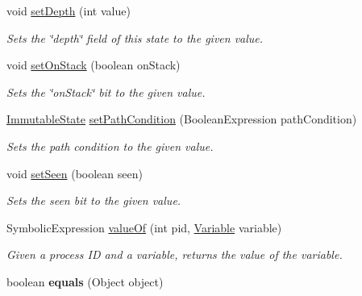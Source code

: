 \begin{DoxyCompactItemize}
void \hyperlink{classedu_1_1udel_1_1cis_1_1vsl_1_1civl_1_1state_1_1common_1_1immutable_1_1ImmutableState_ab6b9de3debfaedac0a7d281d687f5ad8}{set\+Depth} (int value)
\begin{DoxyCompactList}\small\item\em Sets the \char`\"{}depth\char`\"{} field of this state to the given value. \end{DoxyCompactList}\item 
void \hyperlink{classedu_1_1udel_1_1cis_1_1vsl_1_1civl_1_1state_1_1common_1_1immutable_1_1ImmutableState_ab9e4c0ce0614da2f23d60ad4cf98f3ed}{set\+On\+Stack} (boolean on\+Stack)
\begin{DoxyCompactList}\small\item\em Sets the \char`\"{}on\+Stack\char`\"{} bit to the given value. \end{DoxyCompactList}\item 
\hyperlink{classedu_1_1udel_1_1cis_1_1vsl_1_1civl_1_1state_1_1common_1_1immutable_1_1ImmutableState}{Immutable\+State} \hyperlink{classedu_1_1udel_1_1cis_1_1vsl_1_1civl_1_1state_1_1common_1_1immutable_1_1ImmutableState_a81ffda91c5649b5998f19f3a85f8cc6b}{set\+Path\+Condition} (Boolean\+Expression path\+Condition)
\begin{DoxyCompactList}\small\item\em Sets the path condition to the given value. \end{DoxyCompactList}\item 
void \hyperlink{classedu_1_1udel_1_1cis_1_1vsl_1_1civl_1_1state_1_1common_1_1immutable_1_1ImmutableState_a5638bba28e0c3107023f76c45ef58581}{set\+Seen} (boolean seen)
\begin{DoxyCompactList}\small\item\em Sets the seen bit to the given value. \end{DoxyCompactList}\item 
Symbolic\+Expression \hyperlink{classedu_1_1udel_1_1cis_1_1vsl_1_1civl_1_1state_1_1common_1_1immutable_1_1ImmutableState_a3d8a050cbe931b2390e60737b7128ab1}{value\+Of} (int pid, \hyperlink{interfaceedu_1_1udel_1_1cis_1_1vsl_1_1civl_1_1model_1_1IF_1_1variable_1_1Variable}{Variable} variable)
\begin{DoxyCompactList}\small\item\em Given a process I\+D and a variable, returns the value of the variable. \end{DoxyCompactList}\item 
\hypertarget{classedu_1_1udel_1_1cis_1_1vsl_1_1civl_1_1state_1_1common_1_1immutable_1_1ImmutableState_a93c717f7257225b034ef438aaf1c07e4}{}boolean {\bfseries equals} (Object object)\label{classedu_1_1udel_1_1cis_1_1vsl_1_1civl_1_1state_1_1common_1_1immutable_1_1ImmutableState_a93c717f7257225b034ef438aaf1c07e4}


\end{DoxyCompactItemize}
